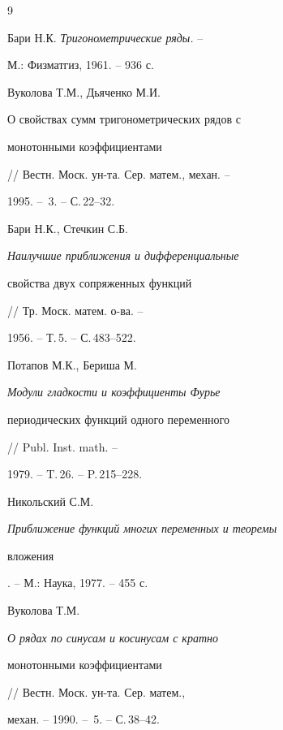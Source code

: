 \begin{thebibliography}{9}







Бари Н.К. {\it Тригонометрические ряды.} --


М.: Физматгиз, 1961. -- 936 с. 




Вуколова Т.М., Дьяченко М.И. {\it 


О свойствах сумм тригонометрических рядов с


монотонными коэффициентами} // Вестн. Моск. ун-та. Сер. матем., механ. --


1995. -- \No\,3. -- С.\,22--32.




Бари Н.К., Стечкин С.Б. {\it Наилучшие приближения и дифференциальные


свойства двух сопряженных функций} // Тр. Моск. матем. о-ва. --


1956. -- Т.\,5. -- С.\,483--522. 




Потапов М.К., Бериша М. {\it Модули гладкости и коэффициенты Фурье


периодических функций одного переменного} // Publ. Inst. math. --


1979. -- T.\,26. -- P.\,215--228. 




Никольский С.М. {\it Приближение функций многих переменных и теоремы


вложения}. -- М.: Наука, 1977. -- 455 с. 




Вуколова Т.М. {\it О рядах по синусам и косинусам с кратно


монотонными коэффициентами} // Вестн. Моск. ун-та. Сер. матем.,


механ. -- 1990. -- \No\,5. -- С.\,38--42. 





\end{thebibliography}





\vskip 2cm











\label{end}








